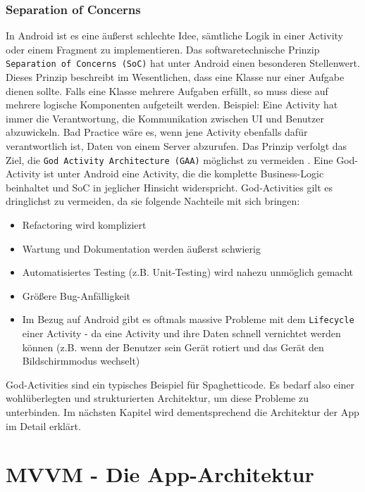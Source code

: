 \hypertarget{separation-of-concerns}{%
\subsection{Separation of Concerns}\label{separation-of-concerns}}

In Android ist es eine äußerst schlechte Idee, sämtliche Logik in einer
Activity oder einem Fragment zu implementieren. Das softwaretechnische
Prinzip \texttt{Separation\ of\ Concerns\ (SoC)} hat unter Android einen
besonderen Stellenwert. Dieses Prinzip beschreibt im Wesentlichen, dass
eine Klasse nur einer Aufgabe dienen sollte. Falls eine Klasse mehrere
Aufgaben erfüllt, so muss diese auf mehrere logische Komponenten
aufgeteilt werden. Beispiel: Eine Activity hat immer die Verantwortung,
die Kommunikation zwischen UI und Benutzer abzuwickeln. Bad Practice
wäre es, wenn jene Activity ebenfalls dafür verantwortlich ist, Daten
von einem Server abzurufen. Das Prinzip verfolgt das Ziel, die
\texttt{God\ Activity\ Architecture\ (GAA)} möglichst zu vermeiden
\cite{god-activities}. Eine God-Activity ist unter Android eine
Activity, die die komplette Business-Logic beinhaltet und SoC in
jeglicher Hinsicht widerspricht. God-Activities gilt es dringlichst zu
vermeiden, da sie folgende Nachteile mit sich bringen:

\begin{itemize}
\tightlist
\item
  Refactoring wird kompliziert
\item
  Wartung und Dokumentation werden äußerst schwierig
\item
  Automatisiertes Testing (z.B. Unit-Testing) wird nahezu unmöglich
  gemacht
\item
  Größere Bug-Anfälligkeit
\item
  Im Bezug auf Android gibt es oftmals massive Probleme mit dem
  \texttt{Lifecycle} einer Activity - da eine Activity und ihre Daten
  schnell vernichtet werden können (z.B. wenn der Benutzer sein Gerät
  rotiert und das Gerät den Bildschirmmodus wechselt)
\end{itemize}

God-Activities sind ein typisches Beispiel für Spaghetticode. Es bedarf
also einer wohlüberlegten und strukturierten Architektur, um diese
Probleme zu unterbinden. Im nächsten Kapitel wird dementsprechend die
Architektur der App im Detail erklärt.

\chapter{MVVM - Die App-Architektur}

